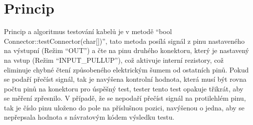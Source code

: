 
\section{Princip}
Princip a algoritmus testování kabelů je v metodě “bool Connector::testConnector(char[])”, tato metoda posílá signál z pinu nastaveného na výstupní (Režim “OUT”) a čte na pinu druhého konektoru, který je nastavený na vstup (Režim “INPUT\_PULLUP”), což aktivuje interní rezistory, což eliminuje chybné čtení způsobeného elektrickým šumem od ostatních pinů. Pokud se podaří přečíst signál, tak je navýšena kontrolní hodnota, která musí být rovna počtu pinů na konektoru pro úspěšný test, tester tento test opakuje třikrát, aby se měření zpřesnilo. V případě, že se nepodaří přečíst signál na protilehlém pinu, tak je číslo pinu uloženo do pole na příslušnou pozici, navýšenou o jedna, aby se nepřepsala hodnota s návratovým kódem výsledku testu.